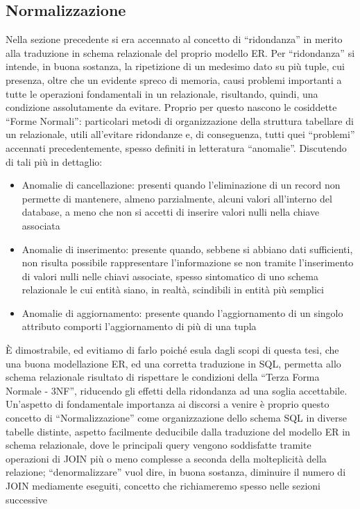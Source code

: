 \documentclass[a4paper,12pt]{report}
\begin{document}
\subsection{Normalizzazione}
Nella sezione precedente si era accennato al concetto di “ridondanza” in merito alla traduzione in schema relazionale del proprio modello ER. Per “ridondanza” si intende, in buona sostanza, la ripetizione di un medesimo dato su più tuple, cui presenza, oltre che un evidente spreco di memoria, causi problemi importanti a tutte le operazioni fondamentali in un relazionale, risultando, quindi, una condizione assolutamente da evitare. Proprio per questo nascono le cosiddette “Forme Normali”: particolari metodi di organizzazione della struttura tabellare di un relazionale, utili all’evitare ridondanze e, di conseguenza, tutti quei “problemi” accennati precedentemente, spesso definiti in letteratura “anomalie”. Discutendo di tali più in dettaglio:
\begin{itemize}
    \item Anomalie di cancellazione: presenti quando l’eliminazione di un record non permette di mantenere, almeno parzialmente, alcuni valori all’interno del database, a meno che non si accetti di inserire valori nulli nella chiave associata
    \item Anomalie di inserimento: presente quando, sebbene si abbiano dati sufficienti, non risulta possibile rappresentare l’informazione se non tramite l’inserimento di valori nulli nelle chiavi associate, spesso sintomatico di uno schema relazionale le cui entità siano, in realtà, scindibili in entità più semplici
    \item Anomalie di aggiornamento: presente quando l’aggiornamento di un singolo attributo comporti l’aggiornamento di più di una tupla
\end{itemize}
È dimostrabile, ed evitiamo di farlo poiché esula dagli scopi di questa tesi, che una buona modellazione ER, ed una corretta traduzione in SQL, permetta allo schema relazionale risultato di rispettare le condizioni della “Terza Forma Normale - 3NF”, riducendo gli effetti della ridondanza ad una soglia accettabile. Un’aspetto di fondamentale importanza ai discorsi a venire è proprio questo concetto di “Normalizzazione” come organizzazione dello schema SQL in diverse tabelle distinte, aspetto facilmente deducibile dalla traduzione del modello ER in schema relazionale, dove le principali query vengono soddisfatte tramite operazioni di JOIN più o meno complesse a seconda della molteplicità della relazione; “denormalizzare” vuol dire, in buona sostanza, diminuire il numero di JOIN mediamente eseguiti, concetto che richiameremo spesso nelle sezioni successive
\end{document}
